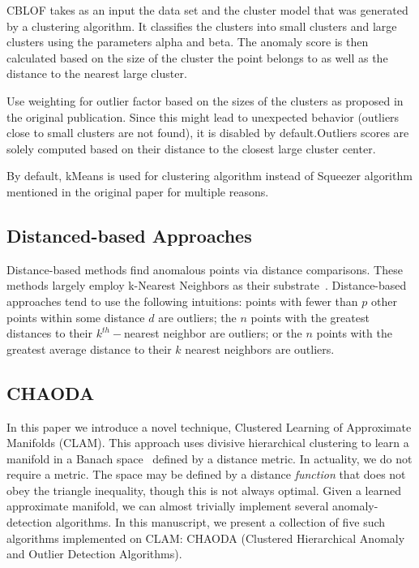 CBLOF takes as an input the data set and the cluster model that was generated by a clustering algorithm.
It classifies the clusters into small clusters and large clusters using the parameters alpha and beta.
The anomaly score is then calculated based on the size of the cluster the point belongs to as well as the distance to the nearest large cluster.

Use weighting for outlier factor based on the sizes of the clusters as proposed in the original publication.
Since this might lead to unexpected behavior (outliers close to small clusters are not found), it is disabled by default.Outliers scores are solely computed based on their distance to the closest large cluster center.

By default, kMeans is used for clustering algorithm instead of Squeezer algorithm mentioned in the original paper for multiple reasons.
\cite{he2003cblof}

\subsection{Distanced-based Approaches}
\label{subsec:related-works:distanced-based-approaches}

Distance-based methods find anomalous points via distance comparisons.
These methods largely employ k-Nearest Neighbors as their substrate~\cite{wang2019progress}.
Distance-based approaches tend to use the following intuitions:
points with fewer than $p$ other points within some distance $d$ are outliers;
the $n$ points with the greatest distances to their $k^{th}-$nearest neighbor are outliers;
or the $n$ points with the greatest average distance to their $k$ nearest neighbors are outliers.

\subsection{CHAODA}
\label{subsec:related-works:chaoda}

In this paper we introduce a novel technique, Clustered Learning of Approximate Manifolds (CLAM).
This approach uses divisive hierarchical clustering to learn a manifold in a Banach space~\cite{banach1929fonctionnelles} defined by a distance metric.
In actuality, we do not require a metric.
The space may be defined by a distance \textit{function} that does not obey the triangle inequality, though this is not always optimal.
Given a learned approximate manifold, we can almost trivially implement several anomaly-detection algorithms.
In this manuscript, we present a collection of five such algorithms implemented on CLAM: CHAODA (Clustered Hierarchical Anomaly and Outlier Detection Algorithms).

